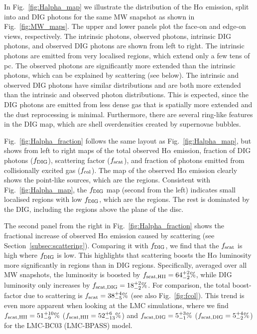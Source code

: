 \documentclass[fleqn,usenatbib]{mnras}
\begin{document}
In Fig.~\ref{fig:Halpha_map} we illustrate the distribution of the H$\alpha$ emission, split into  and DIG photons for the same MW snapshot as shown in Fig.~\ref{fig:MW_maps}. The upper and lower panels plot the face-on and edge-on views, respectively. The intrinsic  photons, observed  photons, intrinsic DIG photons, and observed DIG photons are shown from left to right. The intrinsic  photons are emitted from very localised regions, which extend only a few tens of pc. The observed  photons are significantly more extended than the intrinsic  photons, which can be explained by scattering (see below). The intrinsic and observed DIG photons have similar distributions and are both more extended than the intrinsic and observed  photon distributions. This is expected, since the DIG photons are emitted from less dense gas that is spatially more extended and the dust reprocessing is minimal. Furthermore, there are several ring-like features in the DIG map, which are shell overdensities created by supernovae bubbles.

Fig.~\ref{fig:Halpha_fraction} follows the same layout as Fig.~\ref{fig:Halpha_map}, but shows from left to right maps of the total observed H$\alpha$ emission, fraction of DIG photons ($f_{\rm DIG}$), scattering factor ($f_{\rm scat}$), and fraction of photons emitted from collisionally excited gas ($f_{\rm col}$). The map of the observed H$\alpha$ emission clearly shows the point-like sources, which are the  regions. Consistent with Fig.~\ref{fig:Halpha_map}, the $f_{\rm DIG}$ map (second from the left) indicates small localised regions with low $f_{\rm DIG}$, which are the  regions. The rest is dominated by the DIG, including the regions above the plane of the disc.

The second panel from the right in Fig.~\ref{fig:Halpha_fraction} shows the fractional increase of observed H$\alpha$ emission caused by scattering (see Section~\ref{subsec:scattering}). Comparing it with $f_{\rm DIG}$, we find that the $f_{\rm scat}$ is high where $f_{\rm DIG}$ is low. This highlights that scattering boosts the H$\alpha$ luminosity more significantly in  regions than in DIG regions. Specifically, averaged over all MW snapshots, the  luminosity is boosted by $f_{\rm scat, HII}=64_{-2}^{+2}\%$, while DIG luminosity only increases by $f_{\rm scat, DIG}=18_{-2}^{+2}\%$. For comparison, the total boost-factor due to scattering is $f_{\rm scat}=38_{-5}^{+4}\%$ (see also Fig.~\ref{fig:fcol}). This trend is even more apparent when looking at the LMC simulations, where we find 
$f_{\rm scat, HII}=51_{-9}^{+10}\%$ ($f_{\rm scat, HII}=52_{-13}^{+6}\%$) and
$f_{\rm scat, DIG}=5_{-1}^{+3}\%$ ($f_{\rm scat, DIG}=5_{-2}^{+4}\%$) for the LMC-BC03 (LMC-BPASS) model.
\end{document}

